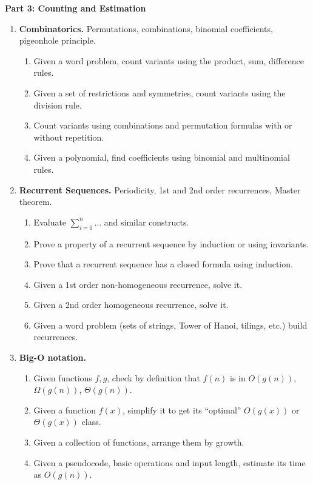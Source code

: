 \documentclass[a4paper,12pt]{article}
\begin{document}
\vspace{10pt}
{\bf Part 3: Counting and Estimation}


{\small
\begin{enumerate}
\item \textbf{Combinatorics.} Permutations, combinations, binomial coefficients, pigeonhole principle.
\begin{enumerate}
\item Given a word problem, count variants using the product, sum, difference rules.
\item Given a set of restrictions and symmetries, count variants using the division rule.
\item Count variants using
combinations and permutation formulas with or without repetition.
\item Given a polynomial, find coefficients using binomial and multinomial rules.
\end{enumerate}

\item \textbf{Recurrent Sequences.} Periodicity, 1st and 2nd order recurrences, Master theorem.
\begin{enumerate}
\item Evaluate $\sum\limits_{i=0}^n \ldots$ and similar constructs.
\item Prove a property of a recurrent sequence by induction or using invariants.
\item Prove that a recurrent sequence has a closed formula using induction.
\item Given a 1st order non-homogeneous recurrence, solve it.
\item Given a 2nd order homogeneous recurrence, solve it.
\item Given a word problem (sets of strings, Tower of Hanoi, tilings, etc.) build recurrences.
\end{enumerate}


\item \textbf{Big-O notation.}
\begin{enumerate}
\item Given functions $f,g$, check by definition that $f(n)$ is in $O(g(n))$, $\Omega(g(n))$, $\Theta(g(n))$.
\item Given a function $f(x)$, simplify it to get its ``optimal'' $O(g(x))$ or $\Theta(g(x))$ class.
\item Given a collection of functions, arrange them by growth.
\item Given a pseudocode, basic operations and input length, estimate its time as $O(g(n))$.
\end{enumerate}
\end{enumerate}
}
\end{document}
